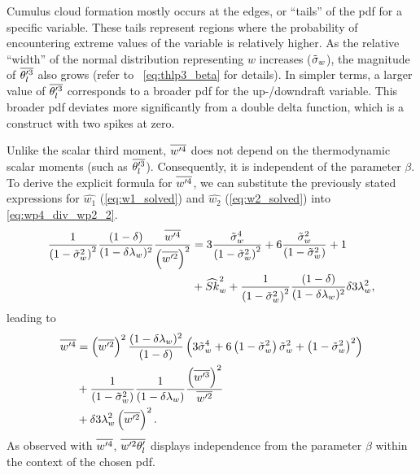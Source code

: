 Cumulus cloud formation mostly occurs at the edges,
or \enquote{tails} of the \gls{pdf} for a specific variable.
These tails represent regions where the probability of encountering extreme values of the variable is relatively higher.
As the relative \enquote{width} of the normal distribution representing $w$ increases (${\tilde{\sigma}_w}$),
the magnitude of $\overline{\theta_l'^3}$ also grows (refer to ~\cref{eq:thlp3_beta} for details).
In simpler terms, a larger value of $\overline{\theta_l'^3}$ corresponds to a broader \gls{pdf} for the up-/downdraft variable.
This broader \gls{pdf} deviates more significantly from a double delta function,
which is a construct with two spikes at zero.

Unlike the scalar third moment,
$\overline{w'^4}$ does not depend on the thermodynamic scalar moments (such as $\overline{\theta_l'^3}$).
Consequently, it is independent of the parameter $\beta$.
To derive the explicit formula for $\overline{w'^4}$,
we can substitute the previously stated expressions for $\widehat{w_1}$ (\cref{eq:w1_solved})
and $\widehat{w_2}$ (\cref{eq:w2_solved}) into \cref{eq:wp4_div_wp2_2}.
\begin{align}
    \label{eq:wp4_div_wp2_2_solved}
    \frac{1}{\left( 1 - \tilde{\sigma}_w^2 \right)^2} \frac{(1-\delta)}{(1-\delta \lambda_w)^2} \frac{\overline{w'^4}}{\left(\overline{w'^2}\right)^2}
    &= 3 \frac{{\tilde{\sigma}_w}^4}{\left( 1 - \tilde{\sigma}_w^2 \right)^2} + 6 \frac{{\tilde{\sigma}_w}^2}{\left( 1 - \tilde{\sigma}_w^2 \right)} + 1 \nonumber\\
    &+ \widehat{Sk}_w^2 + \frac{1}{\left( 1 - \tilde{\sigma}_w^2 \right)^2} \frac{(1-\delta)}{(1-\delta \lambda_w)^2} \delta 3 \lambda_w^2,
\end{align}
leading to
\begin{align}
    \label{eq:wp4}
    \overline{w'^4}
    &= \left(\overline{w'^2}\right)^2
    \frac{(1-\delta \lambda_w)^2}{(1-\delta)}
    \left(3 {\tilde{\sigma}_w}^4 + 6 \left( 1 - \tilde{\sigma}_w^2 \right) {\tilde{\sigma}_w}^2 + \left( 1 - \tilde{\sigma}_w^2 \right)^2\right) \nonumber\\
    &+ \frac{1}{\left( 1 - \tilde{\sigma}_w^2 \right)} \frac{1}{(1-\delta \lambda_w)}
    \frac{\left(\overline{w'^3}\right)^2}{\overline{w'^2}} \nonumber\\
    &+ \delta 3 \lambda_w^2 \left(\overline{w'^2}\right)^2.
\end{align}
As observed with $\overline{w'^4}$,
$\overline{w'^2 \theta_l'}$ displays independence from the parameter $\beta$
within the context of the chosen \gls{pdf}.

